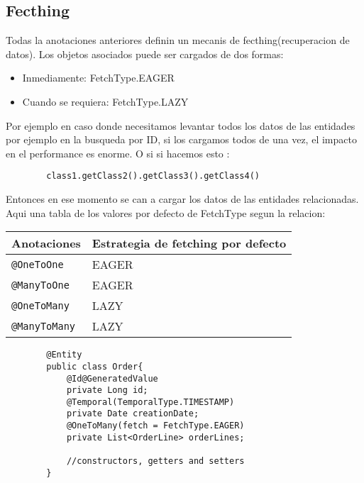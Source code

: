 \documentclass{article}
\begin{document}
\subsection*{Fecthing}
Todas la anotaciones anteriores definin un mecanis de fecthing(recuperacion de datos).
Los objetos asociados puede ser cargados de dos formas:
\begin{itemize}
	\item Inmediamente: FetchType.EAGER
	\item Cuando se requiera: FetchType.LAZY
\end{itemize}
Por ejemplo en caso donde necesitamos levantar todos los datos de las entidades por ejemplo en la busqueda por ID,
si los cargamos todos de una vez, el impacto en el performance es enorme.
O si si hacemos esto :
\begin{lstlisting}
        class1.getClass2().getClass3().getClass4()
    \end{lstlisting}
Entonces en ese momento se can a cargar los datos de las entidades relacionadas.
Aqui una tabla de los valores por defecto de FetchType segun la relacion:
\begin{table}[h]
	\centering
	\begin{tabular}{|l|l|}
		\hline
		\textbf{Anotaciones} & \textbf{Estrategia de fetching por defecto} \\
		\hline
		\texttt{@OneToOne}   & EAGER                                       \\
		\texttt{@ManyToOne}  & EAGER                                       \\
		\texttt{@OneToMany}  & LAZY                                        \\
		\texttt{@ManyToMany} & LAZY                                        \\
		\hline
	\end{tabular}
\end{table}

\newpage

\begin{lstlisting}
        @Entity
        public class Order{
            @Id@GeneratedValue
            private Long id;
            @Temporal(TemporalType.TIMESTAMP)
            private Date creationDate;
            @OneToMany(fetch = FetchType.EAGER)
            private List<OrderLine> orderLines;
    
            //constructors, getters and setters
        }
    \end{lstlisting}
\end{document}
